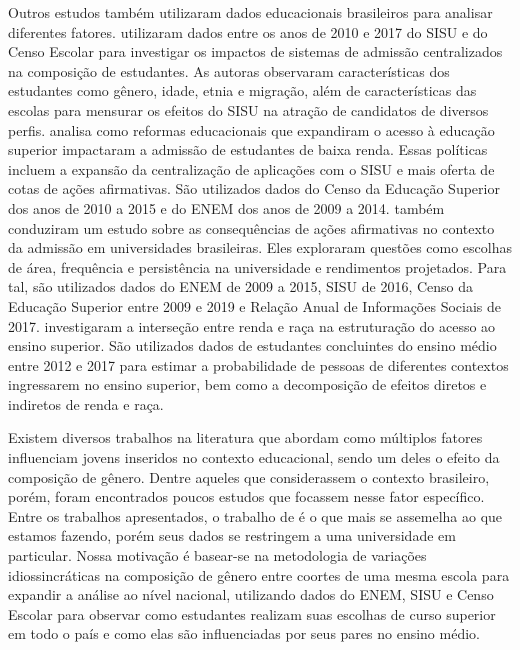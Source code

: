Outros estudos também utilizaram dados educacionais brasileiros para analisar diferentes fatores. \citet{Machado2021} utilizaram dados entre os anos de 2010 e 2017 do SISU e do Censo Escolar para investigar os impactos de sistemas de admissão centralizados na composição de estudantes. As autoras observaram características dos estudantes como gênero, idade, etnia e migração, além de características das escolas para mensurar os efeitos do SISU na atração de candidatos de diversos perfis. \citet{Mello2022} analisa como reformas educacionais que expandiram o acesso à educação superior impactaram a admissão de estudantes de baixa renda. Essas políticas incluem a expansão da centralização de aplicações com o SISU e mais oferta de cotas de ações afirmativas. São utilizados dados do Censo da Educação Superior dos anos de 2010 a 2015 e do ENEM dos anos de 2009 a 2014. \citet{Otero2021} também conduziram um estudo sobre as consequências de ações afirmativas no contexto da admissão em universidades brasileiras. Eles exploraram questões como escolhas de área, frequência e persistência na universidade e rendimentos projetados. Para tal, são utilizados dados do ENEM de 2009 a 2015, SISU de 2016, Censo da Educação Superior entre 2009 e 2019 e Relação Anual de Informações Sociais de 2017. \citet{Carvalhaes2022} investigaram a interseção entre renda e raça na estruturação do acesso ao ensino superior. São utilizados dados de estudantes concluintes do ensino médio entre 2012 e 2017 para estimar a probabilidade de pessoas de diferentes contextos ingressarem no ensino superior, bem como a decomposição de efeitos diretos e indiretos de renda e raça. 

Existem diversos trabalhos na literatura que abordam como múltiplos fatores influenciam jovens inseridos no contexto educacional, sendo um deles o efeito da composição de gênero. Dentre aqueles que considerassem o contexto brasileiro, porém, foram encontrados poucos estudos que focassem nesse fator específico. Entre os trabalhos apresentados, o trabalho de \citet{Borges2021} é o que mais se assemelha ao que estamos fazendo, porém seus dados se restringem a uma universidade em particular. Nossa motivação é basear-se na metodologia de variações idiossincráticas na composição de gênero entre coortes de uma mesma escola para expandir a análise ao nível nacional, utilizando dados do ENEM, SISU e Censo Escolar para observar como estudantes realizam suas escolhas de curso superior em todo o país e como elas são influenciadas por seus pares no ensino médio. 